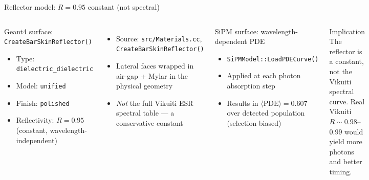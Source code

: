 \documentclass[aspectratio=169,9pt]{beamer}
\begin{document}
\begin{frame}{Reflector model: $R=0.95$ constant (not spectral)}
\begin{columns}[c]
\begin{block}{Geant4 surface: \texttt{CreateBarSkinReflector()}}
\begin{itemize}\setlength\itemsep{3pt}
  \item Type: \texttt{dielectric\_dielectric}
  \item Model: \texttt{unified}
  \item Finish: \texttt{polished}
  \item Reflectivity: $R=0.95$ (constant,
    wavelength-independent)
\end{itemize}
\end{block}
\begin{itemize}\setlength\itemsep{3pt}
  \item Source: \texttt{src/Materials.cc},
    \texttt{CreateBarSkinReflector()}
  \item Lateral faces wrapped in air-gap + Mylar
    in the physical geometry
  \item \emph{Not} the full Vikuiti ESR spectral
    table — a conservative constant
\end{itemize}
\begin{block}{SiPM surface: wavelength-dependent PDE}
\begin{itemize}\setlength\itemsep{3pt}
  \item \texttt{SiPMModel::LoadPDECurve()}
  \item Applied at each photon absorption step
  \item Results in $\langle\mathrm{PDE}\rangle=0.607$
    over detected population (selection-biased)
\end{itemize}
\end{block}
\begin{alertblock}{Implication}
The reflector is a constant, not the Vikuiti
spectral curve. Real Vikuiti $R\sim0.98$–$0.99$
would yield more photons and better timing.
\end{alertblock}
\end{columns}
\end{frame}
\end{document}
